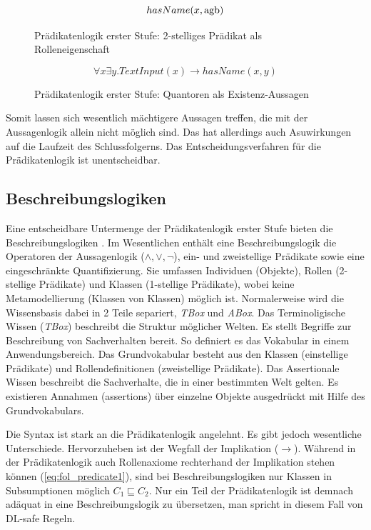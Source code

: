 \documentclass[runningheads,a4paper]{llncs}
\begin{document}
\begin{figure}
\begin{equation}
hasName(x, \textnormal{agb})
\label{eq:fol_predicate2}
\end{equation}
\caption{Prädikatenlogik erster Stufe: 2-stelliges Prädikat als Rolleneigenschaft}
\end{figure}

\begin{figure}
\begin{equation}
\forall x\exists y. TextInput(x) \to hasName(x, y)
\label{eq:fol_quantors}
\end{equation}
\caption{Prädikatenlogik erster Stufe: Quantoren als Existenz-Aussagen}
\end{figure}

Somit lassen sich wesentlich mächtigere Aussagen treffen, die mit der Aussagenlogik allein nicht möglich sind.
Das hat allerdings auch Asuwirkungen auf die Laufzeit des Schlussfolgerns.
Das Entscheidungsverfahren für die Prädikatenlogik ist unentscheidbar. 
\\

\subsection{Beschreibungslogiken}
\label{sec:desclogic}

Eine entscheidbare Untermenge der Prädikatenlogik erster Stufe bieten die Beschreibungslogiken \cite{foundations}.
Im Wesentlichen enthält eine Beschreibungslogik die Operatoren der Aussagenlogik (\(\land, \lor, \neg\)), ein- und zweistellige Prädikate sowie eine eingeschränkte Quantifizierung.
Sie umfassen Individuen (Objekte), Rollen (2-stellige Prädikate) und Klassen (1-stellige Prädikate), wobei keine Metamodellierung (Klassen von Klassen) möglich ist.
Normalerweise wird die Wissensbasis dabei in 2 Teile separiert, \textit{TBox} und \textit{ABox}. 
Das Terminoligische Wissen (\textit{TBox}) beschreibt die Struktur möglicher Welten. 
Es stellt Begriffe zur Beschreibung von Sachverhalten bereit. 
So definiert es das Vokabular in einem Anwendungsbereich. 
Das Grundvokabular besteht aus den Klassen (einstellige Prädikate) und Rollendefinitionen (zweistellige Prädikate). 
Das Assertionale Wissen beschreibt die Sachverhalte, die in einer bestimmten Welt gelten. 
Es existieren Annahmen (assertions) über einzelne Objekte ausgedrückt mit
Hilfe des Grundvokabulars.

Die Syntax ist stark an die Prädikatenlogik angelehnt. 
Es gibt jedoch wesentliche Unterschiede. 
Hervorzuheben ist der Wegfall der Implikation (\(\to\)). 
Während in der Prädikatenlogik auch Rollenaxiome rechterhand der Implikation stehen können (\eqref{eq:fol_predicate1}), sind bei Beschreibungslogiken nur Klassen in Subsumptionen möglich \(C_1 \sqsubseteq C_2\).
Nur ein Teil der Prädikatenlogik ist demnach adäquat in eine Beschreibungslogik zu übersetzen, man spricht in diesem Fall von DL-safe Regeln. 
\end{document}
